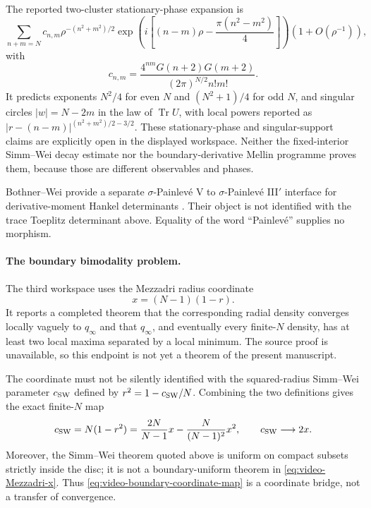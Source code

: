 The reported two-cluster stationary-phase expansion is
\begin{equation}
 \sum_{n+m=N}c_{n,m}\rho^{-(n^2+m^2)/2}
 \exp\!\left(i\left[(n-m)\rho-\frac{\pi(n^2-m^2)}4\right]\right)
 \left(1+O(\rho^{-1})\right),
 \label{eq:video-trace-tail}
\end{equation}
with
\begin{equation}
 c_{n,m}=\frac{4^{nm}G(n+2)G(m+2)}{(2\pi)^{N/2}n!m!}.
 \label{eq:video-trace-tail-coeff}
\end{equation}
It predicts exponents $N^2/4$ for even $N$ and $(N^2+1)/4$ for odd $N$, and singular
circles $|w|=N-2m$ in the law of $\operatorname{Tr}U$, with local powers reported as
$|r-(n-m)|^{(n^2+m^2)/2-3/2}$.  These stationary-phase and singular-support claims are
explicitly open in the displayed workspace.  Neither the fixed-interior Simm--Wei decay
estimate nor the boundary-derivative Mellin programme proves them, because those are
different observables and phases.

Bothner--Wei provide a separate $\sigma$-Painlev\'e V to
$\sigma$-Painlev\'e III$'$ interface for derivative-moment Hankel determinants
\cite{bothnerWei2025}.  Their object is not identified with the trace Toeplitz determinant
above.  Equality of the word ``Painlev\'e'' supplies no morphism.

\paragraph{The boundary bimodality problem.}
The third workspace uses the Mezzadri radius coordinate
\begin{equation}
 x=(N-1)(1-r).
 \label{eq:video-Mezzadri-x}
\end{equation}
It reports a completed theorem that the corresponding radial density converges locally
vaguely to $q_\infty$ and that $q_\infty$, and eventually every finite-$N$ density, has
at least two local maxima separated by a local minimum.  The source proof is unavailable,
so this endpoint is not yet a theorem of the present manuscript.

The coordinate must not be silently identified with the squared-radius Simm--Wei
parameter $c_{\rm SW}$ defined by $r^2=1-c_{\rm SW}/N$.  Combining the two definitions
gives the exact finite-$N$ map
\begin{equation}
 c_{\rm SW}
 =N(1-r^2)
 =\frac{2N}{N-1}x-\frac{N}{(N-1)^2}x^2,
 \qquad c_{\rm SW}\longrightarrow2x.
 \label{eq:video-boundary-coordinate-map}
\end{equation}
Moreover, the Simm--Wei theorem quoted above is uniform on compact subsets strictly
inside the disc; it is not a boundary-uniform theorem in
\eqref{eq:video-Mezzadri-x}.  Thus \eqref{eq:video-boundary-coordinate-map} is a
coordinate bridge, not a transfer of convergence.


